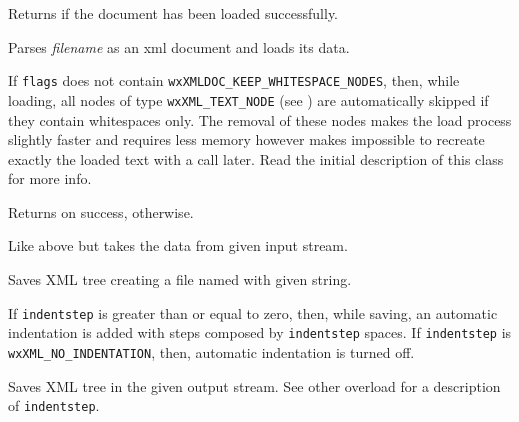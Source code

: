 
Returns \true if the document has been loaded successfully.



\label{wxxmldocumentload}


Parses {\it filename} as an xml document and loads its data.

If {\tt flags} does not contain {\tt wxXMLDOC\_KEEP\_WHITESPACE\_NODES}, then, while loading, all nodes of
type {\tt wxXML\_TEXT\_NODE} (see ) are automatically skipped if they
contain whitespaces only.
The removal of these nodes makes the load process slightly faster and requires less memory however
makes impossible to recreate exactly the loaded text with a  call later.
Read the initial description of this class for more info.

Returns \true on success, \false otherwise.


Like above but takes the data from given input stream.


\label{wxxmldocumentsave}


Saves XML tree creating a file named with given string.

If {\tt indentstep} is greater than or equal to zero, then, while saving, an automatic indentation
is added with steps composed by {\tt indentstep} spaces.
If {\tt indentstep} is {\tt wxXML\_NO\_INDENTATION}, then, automatic indentation is turned off.


Saves XML tree in the given output stream. See other overload for a description of {\tt indentstep}.


\label{wxxmldocumentsetencoding}


